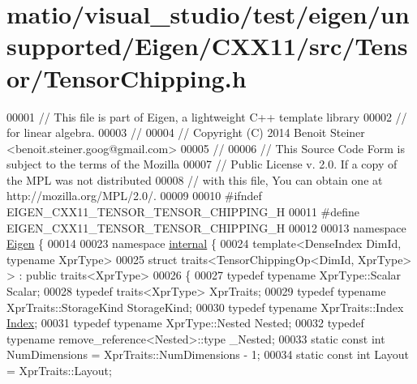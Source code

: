 \hypertarget{matio_2visual__studio_2test_2eigen_2unsupported_2_eigen_2_c_x_x11_2src_2_tensor_2_tensor_chipping_8h_source}{}\section{matio/visual\+\_\+studio/test/eigen/unsupported/\+Eigen/\+C\+X\+X11/src/\+Tensor/\+Tensor\+Chipping.h}
\label{matio_2visual__studio_2test_2eigen_2unsupported_2_eigen_2_c_x_x11_2src_2_tensor_2_tensor_chipping_8h_source}

\begin{DoxyCode}
00001 \textcolor{comment}{// This file is part of Eigen, a lightweight C++ template library}
00002 \textcolor{comment}{// for linear algebra.}
00003 \textcolor{comment}{//}
00004 \textcolor{comment}{// Copyright (C) 2014 Benoit Steiner <benoit.steiner.goog@gmail.com>}
00005 \textcolor{comment}{//}
00006 \textcolor{comment}{// This Source Code Form is subject to the terms of the Mozilla}
00007 \textcolor{comment}{// Public License v. 2.0. If a copy of the MPL was not distributed}
00008 \textcolor{comment}{// with this file, You can obtain one at http://mozilla.org/MPL/2.0/.}
00009 
00010 \textcolor{preprocessor}{#ifndef EIGEN\_CXX11\_TENSOR\_TENSOR\_CHIPPING\_H}
00011 \textcolor{preprocessor}{#define EIGEN\_CXX11\_TENSOR\_TENSOR\_CHIPPING\_H}
00012 
00013 \textcolor{keyword}{namespace }\hyperlink{namespace_eigen}{Eigen} \{
00014 
00023 \textcolor{keyword}{namespace }\hyperlink{namespaceinternal}{internal} \{
00024 \textcolor{keyword}{template}<DenseIndex DimId, \textcolor{keyword}{typename} XprType>
00025 \textcolor{keyword}{struct }traits<TensorChippingOp<DimId, XprType> > : \textcolor{keyword}{public} traits<XprType>
00026 \{
00027   \textcolor{keyword}{typedef} \textcolor{keyword}{typename} XprType::Scalar Scalar;
00028   \textcolor{keyword}{typedef} traits<XprType> XprTraits;
00029   \textcolor{keyword}{typedef} \textcolor{keyword}{typename} XprTraits::StorageKind StorageKind;
00030   \textcolor{keyword}{typedef} \textcolor{keyword}{typename} XprTraits::Index \hyperlink{namespace_eigen_a62e77e0933482dafde8fe197d9a2cfde}{Index};
00031   \textcolor{keyword}{typedef} \textcolor{keyword}{typename} XprType::Nested Nested;
00032   \textcolor{keyword}{typedef} \textcolor{keyword}{typename} remove\_reference<Nested>::type \_Nested;
00033   \textcolor{keyword}{static} \textcolor{keyword}{const} \textcolor{keywordtype}{int} NumDimensions = XprTraits::NumDimensions - 1;
00034   \textcolor{keyword}{static} \textcolor{keyword}{const} \textcolor{keywordtype}{int} Layout = XprTraits::Layout;

\end{DoxyCode}
